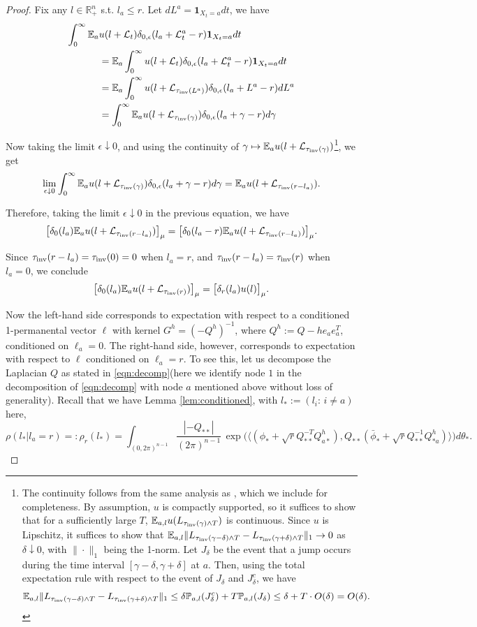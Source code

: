 \documentclass[a4paper, 11pt]{article}
\renewcommand{\P}{\mathbb{P}}
\newcommand{\E}{\mathbb{E}}
\newcommand{\ind}{\mathbf{1}}
\newcommand{\Ell}{\mathcal{L}}
\newcommand{\inv}{\tau_\textnormal{inv}}
\newcommand{\orthp}{{\mathbb{R}_+^n}}
\begin{document}
\begin{proof}
Fix any $l\in\orthp$ s.t. $l_a\leq r$. Let $dL^a = \ind_{X_t=a}dt$, we have
\begin{equation*}
\begin{aligned}
\int_0^\infty\E_a & u(l+\Ell_t) \delta_{0,\epsilon}( l_a+\Ell_t^a-r)\ind_{X_t=a}dt\\
&=\E_a \int_0^\infty u(l+\Ell_t) \delta_{0,\epsilon}( l_a+\Ell_t^a-r)\ind_{X_t=a}dt\\
&=\E_a \int_0^\infty u(l+\Ell_{\inv(L^a)})\delta_{0,\epsilon}( l_a+L^a-r)dL^a\\
&=\int_0^\infty\E_a u(l+\Ell_{\inv(\gamma)})\delta_{0,\epsilon}( l_a+\gamma-r)d\gamma
\end{aligned}
\end{equation*}

Now taking the limit $\epsilon\downarrow 0$, and using the continuity of $\gamma\mapsto  \E_a u(l+\Ell_{\inv(\gamma)})$\footnote{The continuity follows from the same analysis as \cite[footnote 1, pg. 9]{bhs21}, which we include for completeness. By assumption, $u$ is compactly supported, so it suffices to show that for a sufficiently large $T$, $\E_{a,l} u(L_{\inv(\gamma)\wedge T})$ is continuous. Since $u$ is Lipschitz, it suffices to show that $\E_{a,l} \|L_{\inv(\gamma-\delta)\wedge T}-L_{\inv(\gamma+\delta)\wedge T}\|_1\rightarrow 0$ as $\delta\downarrow 0$, with $\|\cdot\|_1$ being the 1-norm. Let $J_\delta$ be the event that a jump occurs during the time interval $[\gamma-\delta,\gamma+\delta]$ at $a$. Then, using the total expectation rule with respect to the event of $J_\delta$ and $J_\delta^c$, we have
\[\E_{a,l} \|L_{\inv(\gamma-\delta)\wedge T}-L_{\inv(\gamma+\delta)\wedge T}\|_1\leq \delta\P_{a,l}(J_\delta^c)+T\P_{a,l}(J_\delta)\leq \delta+T\cdot O(\delta)=O(\delta).\]
}, we get
\[\lim_{\epsilon\downarrow 0} \int_0^\infty\E_a u(l+\Ell_{\inv(\gamma)})\delta_{0,\epsilon}( l_a+\gamma-r)d\gamma=\E_a u(l+\Ell_{\inv(r-l_a)}).\]

Therefore, taking the limit $\epsilon\downarrow 0$ in the previous equation, we have
\[\big[\delta_0(l_a) \E_a u(l+\Ell_{\inv(r-l_a)})\big]_\mu
=\big[ \delta_0(l_a-r) \E_a u(l+\Ell_{\inv(r-l_a)})\big]_\mu.\]

Since $\inv(r-l_a)=\inv(0)=0$ when $l_a=r$, and $\inv(r-l_a)=\inv(r)$ when $l_a=0$, we conclude
\[\big[ \delta_0(l_a) \E_a u(l+\Ell_{\inv(r)})\big]_\mu=\big[ \delta_r(l_a)  u(l)\big]_\mu.\]

Now the left-hand side corresponds to expectation with respect to a conditioned 1-permanental vector $\ell$ with kernel $G^h=(-Q^h)^{-1}$, where $Q^h:=Q-he_ae_a^T$, conditioned on $\ell_a=0$. The right-hand side, however, corresponds to expectation with respect to $\ell$ conditioned on $\ell_a=r$. To see this, let us decompose the Laplacian $Q$ as stated in \cref{eqn:decomp}(here we identify node $1$ in the decomposition of \cref{eqn:decomp} with node $a$ mentioned above without loss of generality). Recall that we have Lemma \ref{lem:conditioned}, with $l_*:=(l_i:\,i\neq a)$ here,
\[\rho(l_*|l_a=r)=:\rho_r(l_*) =  \int_{(0,2\pi)^{n-1}}\frac{|-Q_{**}|}{(2\pi)^{n-1}}\,
\exp\Big(\langle (\phi_*+ \sqrt{r}Q_{**}^{-T}Q_{a*}^h), Q_{**}(\bar{\phi}_*+ \sqrt{r}Q_{**}^{-1}Q_{*a}^h)\rangle\Big)d\theta_*.\]


\end{proof}
\end{document}
